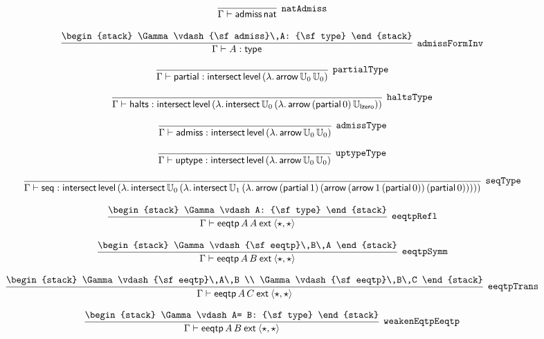 \[
\infer[{\tt natAdmiss}]{\Gamma \vdash {\sf admiss}\,{\sf nat}}{}
\]

\[
\infer[{\tt admissFormInv}]{\Gamma \vdash A: {\sf type}}{
\begin{stack}
\Gamma \vdash {\sf admiss}\,A: {\sf type}
\end{stack}}
\]

\[
\infer[{\tt partialType}]{\Gamma \vdash {\sf partial}: {\sf intersect}\,{\sf level}\,(\lambda .\,{\sf arrow}\,{\Bbb U}_{0}\,{\Bbb U}_{0})}{}
\]

\[
\infer[{\tt haltsType}]{\Gamma \vdash {\sf halts}: {\sf intersect}\,{\sf level}\,(\lambda .\,{\sf intersect}\,{\Bbb U}_{0}\,(\lambda .\,{\sf arrow}\,({\sf partial}\,0)\,{\Bbb U}_{{\sf lzero}}))}{}
\]

\[
\infer[{\tt admissType}]{\Gamma \vdash {\sf admiss}: {\sf intersect}\,{\sf level}\,(\lambda .\,{\sf arrow}\,{\Bbb U}_{0}\,{\Bbb U}_{0})}{}
\]

\[
\infer[{\tt uptypeType}]{\Gamma \vdash {\sf uptype}: {\sf intersect}\,{\sf level}\,(\lambda .\,{\sf arrow}\,{\Bbb U}_{0}\,{\Bbb U}_{0})}{}
\]

\[
\infer[{\tt seqType}]{\Gamma \vdash {\sf seq}: {\sf intersect}\,{\sf level}\,(\lambda .\,{\sf intersect}\,{\Bbb U}_{0}\,(\lambda .\,{\sf intersect}\,{\Bbb U}_{1}\,(\lambda .\,{\sf arrow}\,({\sf partial}\,1)\,({\sf arrow}\,({\sf arrow}\,1\,({\sf partial}\,0))\,({\sf partial}\,0)))))}{}
\]

\[
\infer[{\tt eeqtpRefl}]{\Gamma \vdash {\sf eeqtp}\,A\,A\:{\sf ext}\:\langle \star ,\star \rangle }{
\begin{stack}
\Gamma \vdash A: {\sf type}
\end{stack}}
\]

\[
\infer[{\tt eeqtpSymm}]{\Gamma \vdash {\sf eeqtp}\,A\,B\:{\sf ext}\:\langle \star ,\star \rangle }{
\begin{stack}
\Gamma \vdash {\sf eeqtp}\,B\,A
\end{stack}}
\]

\[
\infer[{\tt eeqtpTrans}]{\Gamma \vdash {\sf eeqtp}\,A\,C\:{\sf ext}\:\langle \star ,\star \rangle }{
\begin{stack}
\Gamma \vdash {\sf eeqtp}\,A\,B
\\
\Gamma \vdash {\sf eeqtp}\,B\,C
\end{stack}}
\]

\[
\infer[{\tt weakenEqtpEeqtp}]{\Gamma \vdash {\sf eeqtp}\,A\,B\:{\sf ext}\:\langle \star ,\star \rangle }{
\begin{stack}
\Gamma \vdash A= B: {\sf type}
\end{stack}}
\]

